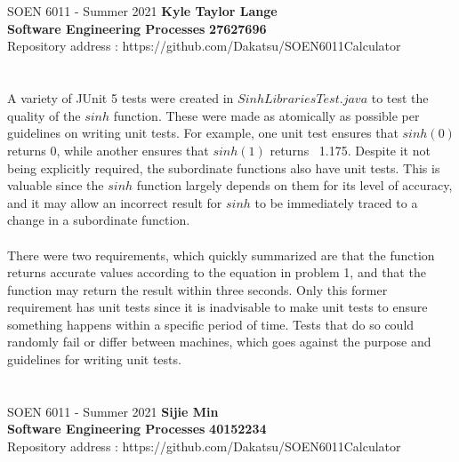 \documentclass[letterpaper, 11pt]{report}
\begin{document}
\section*{}
\normalsize {SOEN 6011 - Summer 2021} \hfill \textbf{Kyle Taylor Lange} \\
\textbf{ Software Engineering Processes}  \hfill \textbf{27627696} \\
\hfill Repository address : https://github.com/Dakatsu/SOEN6011Calculator
\\\\\\
A variety of JUnit 5 tests were created in $SinhLibrariesTest.java$ to test the quality of the $sinh$ function. These were made as atomically as possible per guidelines on writing unit tests. For example, one unit test ensures that $sinh(0)$ returns 0, while another ensures that $sinh(1)$ returns ~1.175. Despite it not being explicitly required, the subordinate functions also have unit tests. This is valuable since the $sinh$ function largely depends on them for its level of accuracy, and it may allow an incorrect result for $sinh$ to be immediately traced to a change in a subordinate function. \\\\

There were two requirements, which quickly summarized are that the function returns accurate values according to the equation in problem 1, and that the function may return the result within three seconds. Only this former requirement has unit tests since it is inadvisable to make unit tests to ensure something happens within a specific period of time. Tests that do so could randomly fail or differ between machines, which goes against the purpose and guidelines for writing unit tests.

\pagebreak

\section*{}
\normalsize {SOEN 6011 - Summer 2021} \hfill \textbf{Sijie Min} \\
\textbf{ Software Engineering Processes}  \hfill \textbf{40152234} \\
\hfill Repository address : https://github.com/Dakatsu/SOEN6011Calculator
\\\\\\\\\\
\end{document}
